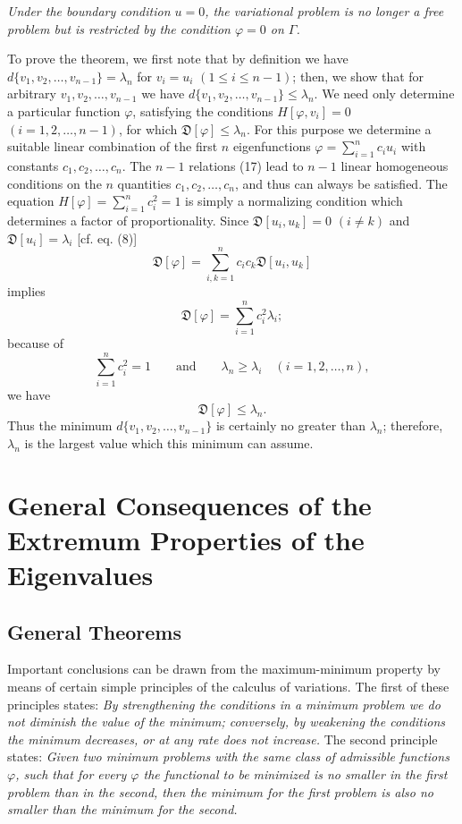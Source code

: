 \emph{Under the boundary condition $u=0$, the variational problem is no longer a free problem but is restricted by the condition $\varphi=0$ on $\Gamma$.}

To prove the theorem, we first note that by definition we have $d\{v_1,\allowbreak v_2,\allowbreak\ldots,\allowbreak v_{n-1}\}=\lambda_n$ for $v_i=u_i$ $(1\le i\le n-1)$; then, we show that for arbitrary $v_1,v_2,\ldots,v_{n-1}$ we have $d\{v_1,\allowbreak v_2,\allowbreak\ldots,\allowbreak v_{n-1}\}\le\lambda_n$. We need only determine a particular function $\varphi$, satisfying the conditions $H[\varphi,v_i]=0$ $(i=1,2,\ldots,n-1)$, for which $\mathfrak D[\varphi]\le\lambda_n$. For this purpose we determine a suitable linear combination of the first $n$ eigenfunctions $\varphi=\sum_{i=1}^n c_i u_i$ with constants $c_1,c_2,\ldots,c_n$. The $n-1$ relations (17) lead to $n-1$ linear homogeneous conditions on the $n$ quantities $c_1,c_2,\ldots,c_n$, and thus can always be satisfied. The equation $H[\varphi]=\sum_{i=1}^nc_i^2=1$ is simply a normalizing condition which determines a factor of proportionality. Since $\mathfrak D[u_i,u_k]=0$ $(i\ne k)$ and $\mathfrak D[u_i]=\lambda_i$ [cf. eq. (8)]
\[
\mathfrak D[\varphi]=\sum_{i,k=1}^n c_i c_k\mathfrak D[u_i,u_k]
\]
implies
\[
\mathfrak D[\varphi]=\sum_{i=1}^n c_i^2\lambda_i;
\]
because of
\[
\sum_{i=1}^n c_i^2=1
\qquad\text{and}\qquad
\lambda_n\ge\lambda_i\quad(i=1,2,\ldots,n),
\]
we have
\[
\mathfrak D[\varphi]\le\lambda_n.
\]
Thus the minimum $d\{v_1,\allowbreak v_2,\allowbreak\ldots,\allowbreak v_{n-1}\}$ is certainly no greater than $\lambda_n$; therefore, $\lambda_n$ is the largest value which this minimum can assume.

\section{General Consequences of the Extremum Properties of the Eigenvalues}
\subsection{General Theorems}
Important conclusions can be drawn from the maximum-minimum property by means of certain simple principles of the calculus of variations. The first of these principles states: \emph{By strengthening the conditions in a minimum problem we do not diminish the value of the minimum; conversely, by weakening the conditions the minimum decreases, or at any rate does not increase.} The second principle states: \emph{Given two minimum problems with the same class of admissible functions $\varphi$, such that for every $\varphi$ the functional to be minimized is no smaller in the first problem than in the second, then the minimum for the first problem is also no smaller than the minimum for the second.}


